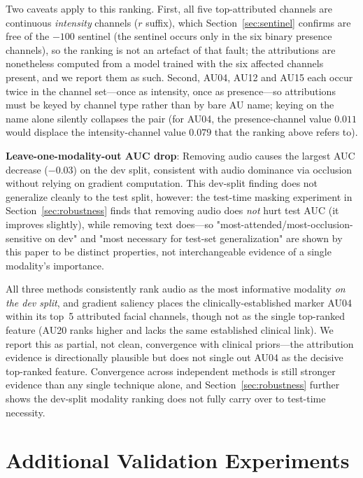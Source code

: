 \documentclass[5p,twocolumn]{elsarticle}
\begin{document}
Two caveats apply to this ranking. First, all five top-attributed
channels are continuous \emph{intensity} channels ($r$ suffix), which
Section~\ref{sec:sentinel} confirms are free of the $-100$ sentinel
(the sentinel occurs only in the six binary presence channels), so the
ranking is not an artefact of that fault; the attributions are
nonetheless computed from a model trained with the six affected
channels present, and we report them as such. Second, AU04, AU12 and
AU15 each occur twice in the channel set---once as intensity, once as
presence---so attributions must be keyed by channel type rather than by
bare AU name; keying on the name alone silently collapses the pair
(for AU04, the presence-channel value $0.011$ would displace the
intensity-channel value $0.079$ that the ranking above refers to).

\textbf{Leave-one-modality-out AUC drop}: Removing audio causes the
largest AUC decrease ($-0.03$) on the dev split, consistent with
audio dominance via occlusion without relying on gradient computation.
This dev-split finding does not generalize cleanly to the test split,
however: the test-time masking experiment in
Section~\ref{sec:robustness} finds that removing audio does
\emph{not} hurt test AUC (it improves slightly), while removing text
does---so "most-attended/most-occlusion-sensitive on dev" and
"most necessary for test-set generalization" are shown by this paper
to be distinct properties, not interchangeable evidence of a single
modality's importance.

All three methods consistently rank audio as the most informative
modality \emph{on the dev split}, and gradient saliency places the
clinically-established marker AU04 within its top~5 attributed facial
channels, though not as the single top-ranked feature (AU20 ranks
higher and lacks the same established clinical link). We report this
as partial, not clean, convergence with clinical priors---the
attribution evidence is directionally plausible but does not single
out AU04 as the decisive top-ranked feature. Convergence
across independent methods is still stronger evidence than any single
technique alone, and Section~\ref{sec:robustness} further shows the
dev-split modality ranking does not fully carry over to test-time
necessity.

\section{Additional Validation Experiments}
\label{sec:additional_validation}
\end{document}
